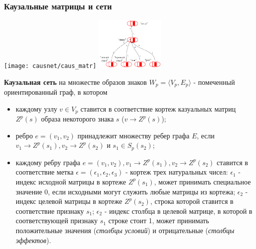 \documentclass[default]{beamer}
\begin{document}
	\begin{frame}
		\frametitle{Каузальные матрицы и сети}
		\scriptsize
		\begin{center}
			\texttt{[image: causnet/caus\_matr]}
			\quad\quad\quad
			\includegraphics[page=1,width=0.25\textwidth]{examples/causnet/caus_net_colored}
		\end{center}
	
		\textbf{Каузальная сеть} на множестве образов знаков $W_p=\langle V_p, E_p \rangle$ - помеченный ориентированный граф, в котором
		\begin{itemize}
			\item каждому узлу $v\in V_p$ ставится в соответствие кортеж казуальных матриц $Z^p(s)$ образа некоторого знака $s$ ($v\rightarrow Z^p(s)$);
			\item ребро $e=(v_1, v_2)$ принадлежит множеству ребер графа $E$, если $v_1\rightarrow Z^p(s_1), v_2\rightarrow Z^p(s_2)$ и $s_1\in S_p(s_2)$;
			\item каждому ребру графа $e=(v_1, v_2), v_1\rightarrow Z^p(s_1), v_2\rightarrow Z^p(s_2)$ ставится в соответствие метка $\epsilon=(\epsilon_1,\epsilon_2,\epsilon_3)$ - кортеж трех натуральных чисел: $\epsilon_1$ - индекс исходной матрицы в кортеже $Z^p(s_1)$, может принимать специальное значение 0, если исходными могут служить любые матрицы из кортежа; $\epsilon_2$ - индекс целевой матрицы в кортеже $Z^p(s_2)$, строка которой ставится в соответствие признаку $s_1$; $\epsilon_2$ - индекс столбца в целевой матрице, в которой в соответствующей признаку $s_1$ строке стоит 1, может принимать положительные значения (\textit{столбцы условий}) и отрицательные (\textit{столбцы эффектов}).

		\end{itemize}
	\end{frame}
	
\end{document}

